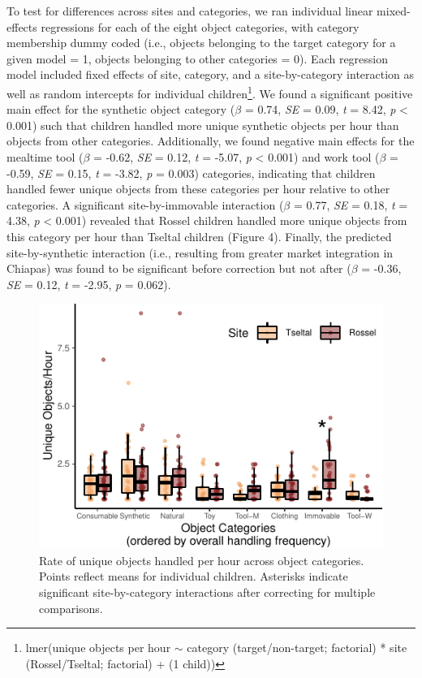 \documentclass[10pt, letterpaper]{article}
\newenvironment{CodeChunk}{}{}
\begin{document}
To test for differences across sites and categories, we ran individual
linear mixed-effects regressions for each of the eight object
categories, with category membership dummy coded (i.e., objects
belonging to the target category for a given model = 1, objects
belonging to other categories = 0). Each regression model included fixed
effects of site, category, and a site-by-category interaction as well as
random intercepts for individual children\footnote{lmer(unique objects
  per hour \({\sim}\) category (target/non-target; factorial) * site
  (Rossel/Tseltal; factorial) + (1 \textbar{} child))}. We found a
significant positive main effect for the synthetic object category
(\(\beta\) = 0.74, \emph{SE} = 0.09, \emph{t} = 8.42, \emph{p}
\textless{} 0.001) such that children handled more unique synthetic
objects per hour than objects from other categories. Additionally, we
found negative main effects for the mealtime tool (\(\beta\) = -0.62,
\emph{SE} = 0.12, \emph{t} = -5.07, \emph{p} \textless{} 0.001) and work
tool (\(\beta\) = -0.59, \emph{SE} = 0.15, \emph{t} = -3.82, \emph{p} =
0.003) categories, indicating that children handled fewer unique objects
from these categories per hour relative to other categories. A
significant site-by-immovable interaction (\(\beta\) = 0.77, \emph{SE} =
0.18, \emph{t} = 4.38, \emph{p} \textless{} 0.001) revealed that Rossel
children handled more unique objects from this category per hour than
Tseltal children (Figure 4). Finally, the predicted site-by-synthetic
interaction (i.e., resulting from greater market integration in Chiapas)
was found to be significant before correction but not after (\(\beta\) =
-0.36, \emph{SE} = 0.12, \emph{t} = -2.95, \emph{p} = 0.062).

\begin{CodeChunk}
\begin{figure}[!h]

\includegraphics{figs/overall-stats-fig-1} \hfill{}

\caption[Rate of unique objects handled per hour across object categories]{Rate of unique objects handled per hour across object categories. Points reflect means for individual children. Asterisks indicate significant site-by-category interactions after correcting for multiple comparisons.}\label{fig:overall-stats-fig}
\end{figure}
\end{CodeChunk}
\end{document}
